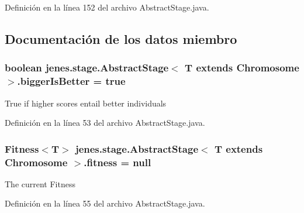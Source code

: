 Definición en la línea 152 del archivo Abstract\-Stage.\-java.



\subsection{Documentación de los datos miembro}
\hypertarget{classjenes_1_1stage_1_1_abstract_stage_3_01_t_01extends_01_chromosome_01_4_a11da35af3fe950eef9882b03e13690d4}{
\subsubsection[{bigger\-Is\-Better}]{\setlength{\rightskip}{0pt plus 5cm}boolean jenes.\-stage.\-Abstract\-Stage$<$ T extends Chromosome $>$.bigger\-Is\-Better = true\hspace{0.3cm}{\ttfamily [protected]}}}\label{classjenes_1_1stage_1_1_abstract_stage_3_01_t_01extends_01_chromosome_01_4_a11da35af3fe950eef9882b03e13690d4}
True if higher scores entail better individuals 

Definición en la línea 53 del archivo Abstract\-Stage.\-java.

\hypertarget{classjenes_1_1stage_1_1_abstract_stage_3_01_t_01extends_01_chromosome_01_4_a697ab8239c1ae2a99445cd7f5fbca45d}{
\subsubsection[{fitness}]{\setlength{\rightskip}{0pt plus 5cm}Fitness$<$T$>$ jenes.\-stage.\-Abstract\-Stage$<$ T extends Chromosome $>$.fitness = null\hspace{0.3cm}{\ttfamily [protected]}}}\label{classjenes_1_1stage_1_1_abstract_stage_3_01_t_01extends_01_chromosome_01_4_a697ab8239c1ae2a99445cd7f5fbca45d}
The current Fitness 

Definición en la línea 55 del archivo Abstract\-Stage.\-java.

